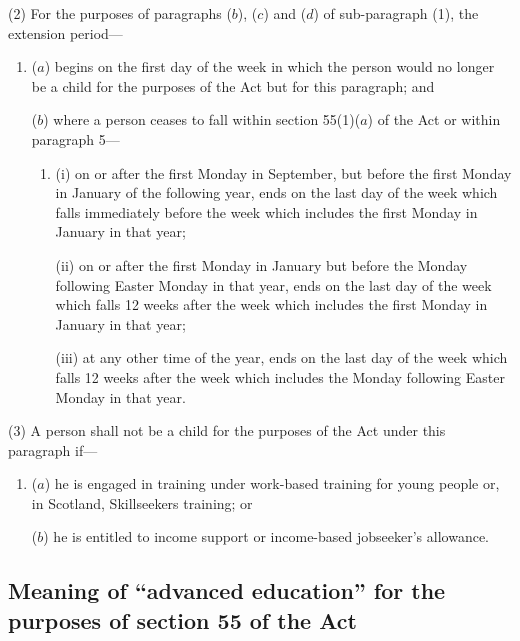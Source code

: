 \documentclass[a4paper,12pt]{article}
\begin{document}
(2) For the purposes of paragraphs ($b$), ($c$) and ($d$) of sub-paragraph (1), the extension period—
\begin{enumerate}\item[]
($a$) begins on the first day of the week in which the person would no longer be a child for the purposes of the Act but for this paragraph; and

($b$) where a person ceases to fall within section 55(1)($a$) of the Act or within paragraph 5—
\begin{enumerate}\item[]
(i) on or after the first Monday in September, but before the first Monday in January of the following year, ends on the last day of the week which falls immediately before the week which includes the first Monday in January in that year;

(ii) on or after the first Monday in January but before the Monday following Easter Monday in that year, ends on the last day of the week which falls 12 weeks after the week which includes the first Monday in January in that year;

(iii) at any other time of the year, ends on the last day of the week which falls 12 weeks after the week which includes the Monday following Easter Monday in that year.
\end{enumerate}
\end{enumerate}

(3) A person shall not be a child for the purposes of the Act under this paragraph if—
\begin{enumerate}\item[]
($a$) he is engaged in training under 
work-based training for young people or, in Scotland, Skillseekers training;  %
or

($b$) he is entitled to income support
or income-based jobseeker’s allowance.  %
\end{enumerate}


\subsection*{Meaning of “advanced education” for the purposes of section 55 of the Act}
\end{document}
